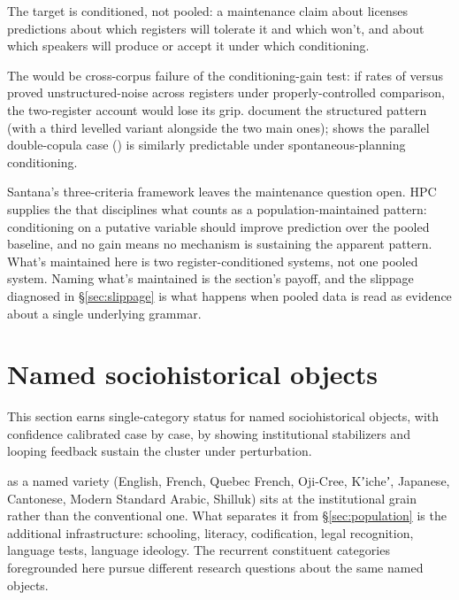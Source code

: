 \documentclass[12pt]{article}
\begin{document}
The  target is conditioned, not pooled: a maintenance claim about  licenses predictions about which registers will tolerate it and which won't, and about which speakers will produce or accept it under which conditioning.

The  would be cross-corpus failure of the conditioning-gain test: if rates of  versus  proved unstructured-noise across registers under properly-controlled comparison, the two-register account would lose its grip. \textcite{krejciHilton2022} document the structured pattern (with a third levelled  variant alongside the two main ones); \textcite{coppock2018double} shows the parallel double-copula case () is similarly predictable under spontaneous-planning conditioning.

Santana's three-criteria framework leaves the maintenance question open. HPC supplies the  that disciplines what counts as a population-maintained pattern: conditioning on a putative variable should improve prediction over the pooled baseline, and no gain means no mechanism is sustaining the apparent pattern. What's maintained here is two register-conditioned systems, not one pooled system. Naming what's maintained is the section's payoff, and the slippage diagnosed in §\ref{sec:slippage} is what happens when pooled data is read as evidence about a single underlying grammar.

\section{Named sociohistorical objects}\label{sec:named}

This section earns single-category status for named sociohistorical objects, with confidence calibrated case by case, by showing institutional stabilizers and looping feedback sustain the cluster under perturbation.

 as a named variety (English, French, Quebec French, Oji-Cree, Kʼicheʼ, Japanese, Cantonese, Modern Standard Arabic, Shilluk) sits at the institutional grain rather than the conventional one. What separates it from §\ref{sec:population} is the additional infrastructure: schooling, literacy, codification, legal recognition, language tests, language ideology. The recurrent constituent categories foregrounded here pursue different research questions about the same named objects.
\end{document}
